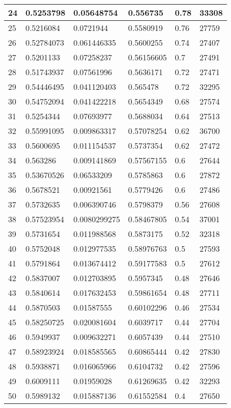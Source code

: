 \begin{longtable}{|l|l|l|l|l|l|}
24 & 0.5253798 & 0.05648754 & 0.556735 & 0.78 & 33308 \\ \hline 
25 & 0.5216084 & 0.0721944 & 0.5580919 & 0.76 & 27759 \\ \hline 
26 & 0.52784073 & 0.061446335 & 0.5600255 & 0.74 & 27407 \\ \hline 
27 & 0.5201133 & 0.07258237 & 0.56156605 & 0.7 & 27491 \\ \hline 
28 & 0.51743937 & 0.07561996 & 0.5636171 & 0.72 & 27471 \\ \hline 
29 & 0.54446495 & 0.041120403 & 0.565478 & 0.72 & 32295 \\ \hline 
30 & 0.54752094 & 0.041422218 & 0.5654349 & 0.68 & 27574 \\ \hline 
31 & 0.5254344 & 0.07693977 & 0.5688034 & 0.64 & 27513 \\ \hline 
32 & 0.55991095 & 0.009863317 & 0.57078254 & 0.62 & 36700 \\ \hline 
33 & 0.5600695 & 0.011154537 & 0.5737354 & 0.62 & 27472 \\ \hline 
34 & 0.563286 & 0.009141869 & 0.57567155 & 0.6 & 27644 \\ \hline 
35 & 0.53670526 & 0.06533209 & 0.5785863 & 0.6 & 27872 \\ \hline 
36 & 0.5678521 & 0.00921561 & 0.5779426 & 0.6 & 27486 \\ \hline 
37 & 0.5732635 & 0.006390746 & 0.5798379 & 0.56 & 27608 \\ \hline 
38 & 0.57523954 & 0.0080299275 & 0.58467805 & 0.54 & 37001 \\ \hline 
39 & 0.5731654 & 0.011988568 & 0.5873175 & 0.52 & 32318 \\ \hline 
40 & 0.5752048 & 0.012977535 & 0.58976763 & 0.5 & 27593 \\ \hline 
41 & 0.5791864 & 0.013674412 & 0.59177583 & 0.5 & 27612 \\ \hline 
42 & 0.5837007 & 0.012703895 & 0.5957345 & 0.48 & 27646 \\ \hline 
43 & 0.5840614 & 0.017632453 & 0.59861654 & 0.48 & 27711 \\ \hline 
44 & 0.5870503 & 0.01587555 & 0.60102296 & 0.46 & 27534 \\ \hline 
45 & 0.58250725 & 0.020081604 & 0.6039717 & 0.44 & 27704 \\ \hline 
46 & 0.5949937 & 0.009632271 & 0.6057439 & 0.44 & 27510 \\ \hline 
47 & 0.58923924 & 0.018585565 & 0.60865444 & 0.42 & 27830 \\ \hline 
48 & 0.5938871 & 0.016065966 & 0.6104732 & 0.42 & 27596 \\ \hline 
49 & 0.6009111 & 0.01959028 & 0.61269635 & 0.42 & 32293 \\ \hline 
50 & 0.5989132 & 0.015887136 & 0.61552584 & 0.4 & 27650 \\ \hline 
\end{longtable}